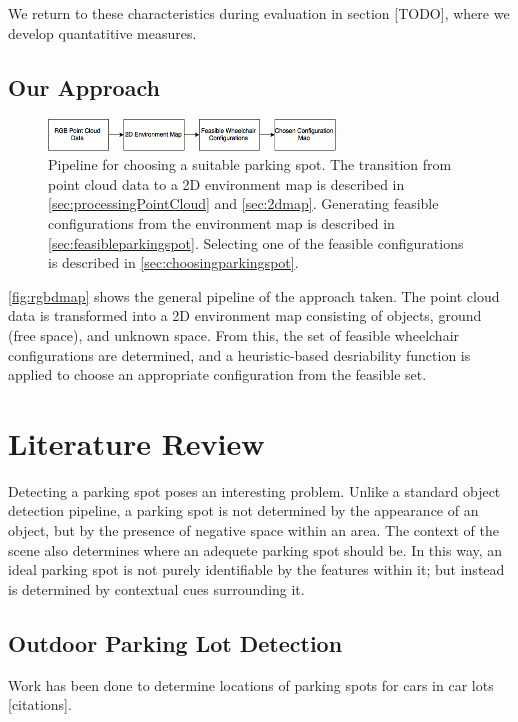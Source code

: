 We return to these characteristics during evaluation in section [TODO], where we
develop quantatitive measures.


\subsection{Our Approach}
\begin{figure}
\centering
\includegraphics[width=3in]{figures/rgbdmap.png}
\caption{Pipeline for choosing a suitable parking spot.
The transition from point cloud data to a 2D environment map is described in
\autoref{sec:processingPointCloud} and \autoref{sec:2dmap}. Generating feasible configurations from the
environment map is described in \autoref{sec:feasibleparkingspot}. Selecting one
of the feasible configurations is described in
\autoref{sec:choosingparkingspot}.}
\label{fig:rgbdmap}
\end{figure}

\autoref{fig:rgbdmap} shows the general pipeline of the approach taken. The
point cloud data is transformed into a 2D environment map consisting of objects,
ground (free space), and unknown space. From this, the set of feasible
wheelchair configurations are determined, and a heuristic-based desriability
function is applied to choose an appropriate configuration from the feasible set.

\section{Literature Review}
\label{sec:parkinglotidentificationlitreview}
Detecting a parking spot poses an interesting problem. Unlike a standard object
detection pipeline, a parking spot is not determined by the appearance of an
object, but by the presence of negative space within an area. The context of the
scene also determines where an adequete parking spot should be. In this way, an
ideal parking spot is not purely identifiable by the features within it; but
instead is determined by contextual cues surrounding it.


\subsection{Outdoor Parking Lot Detection}
Work has been done to determine locations of parking spots for cars in car lots
[citations]. 
\cite{wu2006parking, true2007vacant}

